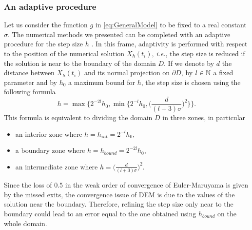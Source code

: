\subsubsection{An adaptive procedure}\label{sec:Adapt}

Let us consider the function $g$ in \eqref{eq:GeneralModel} to be fixed to a real constant $\sigma$. The numerical methods we presented can be completed with an adaptive procedure for the step size $h$ \cite{Giles2016}. In this frame, adaptivity is performed with respect to the position of the numerical solution $X_h(t_i)$, \textit{i.e.}, the step size is reduced if the solution is near to the boundary of the domain $D$. If we denote by $d$ the distance between $X_h(t_i)$ and its normal projection on $\partial D$, by $l \in \mathbb{N}$ a fixed parameter and by $h_0$ a maximum bound for $h$, the step size is chosen using the following formula
\begin{equation}\label{eq:Adaptivity}
	h = \max\Big\{ 2^{-2l}h_0, \min\Big\{ 2^{-l}h_0, \Big(\frac{d}{(l + 3)\sigma}\Big)^2\Big\}\Big\}.
\end{equation}
This formula is equivalent to dividing the domain $D$ in three zones, in particular
\begin{itemize}
	\item an interior zone where $h = h_{int} = 2^{-l}h_0$,
	\item a boundary zone where $h = h_{bound} = 2^{-2l}h_0$,
	\item an intermediate zone where $h = \Big(\frac{d}{(l + 3)\sigma}\Big)^2$.
\end{itemize}
Since the loss of $0.5$ in the weak order of convergence of Euler-Maruyama is given by the missed exits, the convergence issue of DEM is due to the values of the solution near the boundary. Therefore, refining the step size only near to the boundary could lead to an error equal to the one obtained using $h_{bound}$ on the whole domain.
